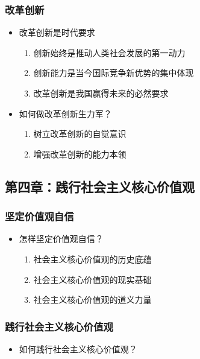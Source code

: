 \documentclass[
]{article}
\begin{document}
\hypertarget{header-n120}{%
\subsubsection{改革创新}\label{header-n120}}

\begin{itemize}
\item
  改革创新是时代要求

  \begin{enumerate}
  \def\labelenumi{\arabic{enumi}.}
  \item
    创新始终是推动人类社会发展的第一动力
  \item
    创新能力是当今国际竞争新优势的集中体现
  \item
    改革创新是我国赢得未来的必然要求
  \end{enumerate}
\item
  如何做改革创新生力军？

  \begin{enumerate}
  \def\labelenumi{\arabic{enumi}.}
  \item
    树立改革创新的自觉意识
  \item
    增强改革创新的能力本领
  \end{enumerate}
\end{itemize}

\hypertarget{header-n154}{%
\subsection{第四章：践行社会主义核心价值观}\label{header-n154}}

\hypertarget{header-n156}{%
\subsubsection{坚定价值观自信}\label{header-n156}}

\begin{itemize}
\item
  怎样坚定价值观自信？

  \begin{enumerate}
  \def\labelenumi{\arabic{enumi}.}
  \item
    社会主义核心价值观的历史底蕴
  \item
    社会主义核心价值观的现实基础
  \item
    社会主义核心价值观的道义力量
  \end{enumerate}
\end{itemize}

\hypertarget{header-n179}{%
\subsubsection{践行社会主义核心价值观}\label{header-n179}}

\begin{itemize}
\item
  如何践行社会主义核心价值观？
\end{itemize}
\end{document}
